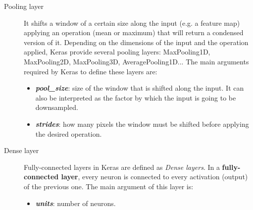 \begin{description}
	\item[{Pooling layer}] It shifts a window of a certain size along the input (e.g. a feature map) applying an operation (mean or maximum) that will return a condensed version of it. Depending on the dimensions of the input and the operation applied, Keras provide several pooling layers: MaxPooling1D, MaxPooling2D, MaxPooling3D, AveragePooling1D... The main arguments required by Keras to define these layers are:
	\begin{itemize}
		\item \textbf{\textit{pool\_size}}: size of the window that is shifted along the input. It can also be interpreted as the factor by which the input is going to be downsampled.
		\item \textbf{\textit{strides}}: how many pixels the window must be shifted before applying the desired operation.
	\end{itemize}
\end{description}
\begin{description}
	\item[Dense layer] Fully-connected layers in Keras are defined as \textit{Dense layers}. In a \textbf{fully-connected layer}, every neuron is connected to every activation (output) of the previous one. The main argument of this layer is:
	\begin{itemize}
		\item \textbf{\textit{units}}: number of neurons.
	\end{itemize} 
\end{description}
